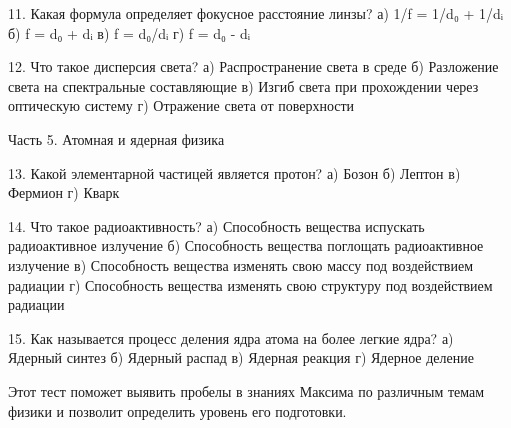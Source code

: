 \documentclass{article}
\begin{document}
11. Какая формула определяет фокусное расстояние линзы?
а) 1/f = 1/d₀ + 1/dᵢ
б) f = d₀ + dᵢ
в) f = d₀/dᵢ
г) f = d₀ - dᵢ

12. Что такое дисперсия света?
а) Распространение света в среде
б) Разложение света на спектральные составляющие
в) Изгиб света при прохождении через оптическую систему
г) Отражение света от поверхности

Часть 5. Атомная и ядерная физика

13. Какой элементарной частицей является протон?
а) Бозон
б) Лептон
в) Фермион
г) Кварк

14. Что такое радиоактивность?
а) Способность вещества испускать радиоактивное излучение
б) Способность вещества поглощать радиоактивное излучение
в) Способность вещества изменять свою массу под воздействием радиации
г) Способность вещества изменять свою структуру под воздействием радиации

15. Как называется процесс деления ядра атома на более легкие ядра?
а) Ядерный синтез
б) Ядерный распад
в) Ядерная реакция
г) Ядерное деление

Этот тест поможет выявить пробелы в знаниях Максима по различным темам физики и позволит определить уровень его подготовки.
\end{document}
